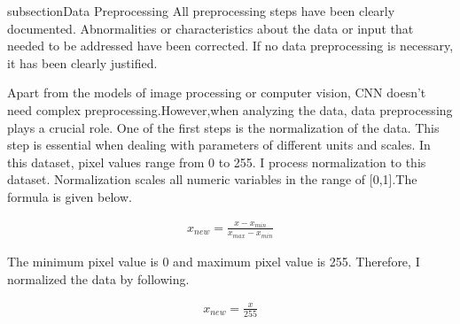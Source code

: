 subsection{Data Preprocessing}
All preprocessing steps have been clearly documented. Abnormalities or characteristics about the data or input that needed to be addressed have been corrected. If no data preprocessing is necessary, it has been clearly justified.

Apart from the models of image processing or computer vision, CNN doesn't need complex preprocessing.However,when analyzing the data, data preprocessing plays a crucial role. One of the first steps is the normalization of the data. This step is essential when dealing with parameters of different units and scales. In this dataset, pixel values range from 0 to 255. I process normalization to this dataset.
Normalization scales all numeric variables in the range of [0,1].The formula is given below.

\begin{eqnarray}
x_{new}=\frac{x-x_{min}}{x_{max}-x_{min}}
\end{eqnarray}

The minimum pixel value is 0 and maximum pixel value is 255. Therefore, I normalized the data by following.



\begin{eqnarray}
x_{new}=\frac{x}{255}
\end{eqnarray}
